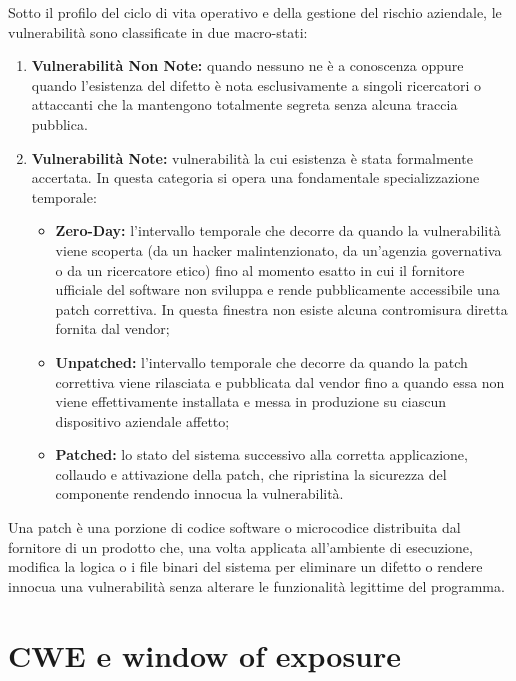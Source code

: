 \documentclass[../../main.tex]{subfiles}
\begin{document}
Sotto il profilo del ciclo di vita operativo e della gestione del rischio aziendale, le vulnerabilità sono classificate in due macro-stati:
\begin{enumerate}
    \item \textbf{Vulnerabilità Non Note:} quando nessuno ne è a conoscenza oppure quando l'esistenza del difetto è nota esclusivamente a singoli ricercatori o attaccanti che la mantengono totalmente segreta senza alcuna traccia pubblica.
    \item \textbf{Vulnerabilità Note:} vulnerabilità la cui esistenza è stata formalmente accertata. In questa categoria si opera una fondamentale specializzazione temporale:
    \begin{itemize}
        \item \textbf{Zero-Day:} l'intervallo temporale che decorre da quando la vulnerabilità viene scoperta (da un hacker malintenzionato, da un'agenzia governativa o da un ricercatore etico) fino al momento esatto in cui il fornitore ufficiale del software non sviluppa e rende pubblicamente accessibile una patch correttiva. In questa finestra non esiste alcuna contromisura diretta fornita dal vendor;
        \item \textbf{Unpatched:} l'intervallo temporale che decorre da quando la patch correttiva viene rilasciata e pubblicata dal vendor fino a quando essa non viene effettivamente installata e messa in produzione su ciascun dispositivo aziendale affetto;
        \item \textbf{Patched:} lo stato del sistema successivo alla corretta applicazione, collaudo e attivazione della patch, che ripristina la sicurezza del componente rendendo innocua la vulnerabilità.
    \end{itemize}
\end{enumerate}

\begin{definition}
Una patch è una porzione di codice software o microcodice distribuita dal fornitore di un prodotto che, una volta applicata all'ambiente di esecuzione, modifica la logica o i file binari del sistema per eliminare un difetto o rendere innocua una vulnerabilità senza alterare le funzionalità legittime del programma.
\end{definition}

\section{CWE e window of exposure}
\label{sec:cwe_epss}
\end{document}
